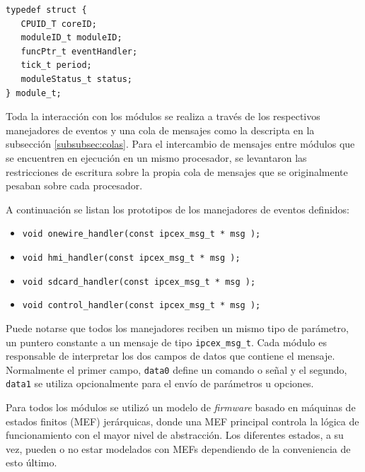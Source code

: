 \vspace{10px}

\begin{lstlisting}[caption={Definición de un nuevo tipo de dato module\_t.},label={lst:module_t}]
typedef struct {
   CPUID_T coreID;
   moduleID_t moduleID;
   funcPtr_t eventHandler;
   tick_t period;
   moduleStatus_t status;
} module_t;
\end{lstlisting}

\vspace{10px}

Toda la interacción con los módulos se realiza a través de los respectivos manejadores de eventos y una cola de mensajes como la descripta en la subsección \ref{subsubsec:colas}. Para el intercambio de mensajes entre módulos que se encuentren en ejecución en un mismo procesador, se levantaron las restricciones de escritura sobre la propia cola de mensajes que se originalmente pesaban sobre cada procesador.

A continuación se listan los prototipos de los manejadores de eventos definidos:

\vspace{10px}

\begin{itemize}
  \item \texttt{void onewire\_handler(const ipcex\_msg\_t * msg );} 
  \item \texttt{void hmi\_handler(const ipcex\_msg\_t * msg );} 
  \item \texttt{void sdcard\_handler(const ipcex\_msg\_t * msg );} 
  \item \texttt{void control\_handler(const ipcex\_msg\_t * msg );} 
\end{itemize}

\vspace{10px}

Puede notarse que todos los manejadores reciben un mismo tipo de parámetro, un puntero constante a un mensaje de tipo \texttt{ipcex\_msg\_t}.  Cada módulo es responsable de interpretar los dos campos de datos que contiene el mensaje.  Normalmente el primer campo, \texttt{data0} define un comando o señal y el segundo, \texttt{data1} se utiliza opcionalmente para el envío de parámetros u opciones.

Para todos los módulos se utilizó un modelo de \textit{firmware} basado en máquinas de estados finitos (MEF) jerárquicas, donde una MEF principal controla la lógica de funcionamiento con el mayor nivel de abstracción. Los diferentes estados, a su vez, pueden o no estar modelados con MEFs dependiendo de la conveniencia de esto último.


